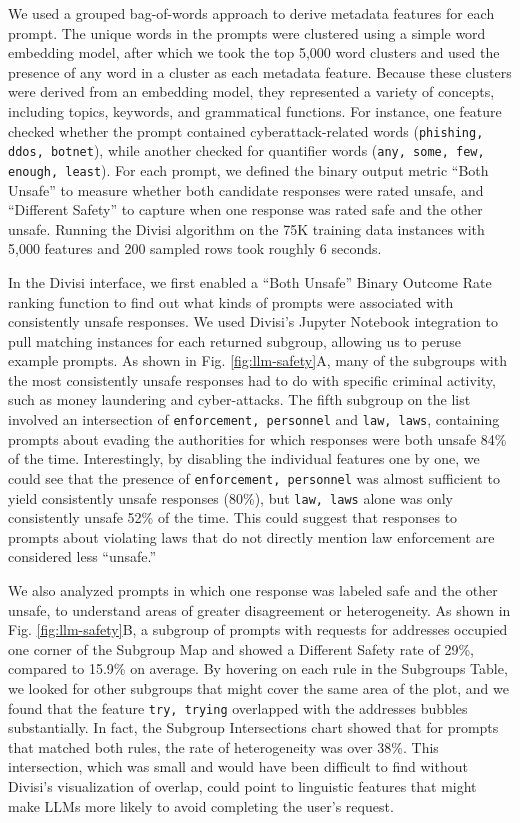 We used a grouped bag-of-words approach to derive metadata features for each prompt.
The unique words in the prompts were clustered using a simple word embedding model, after which we took the top 5,000 word clusters and used the presence of any word in a cluster as each metadata feature.
Because these clusters were derived from an embedding model, they represented a variety of concepts, including topics, keywords, and grammatical functions.
For instance, one feature checked whether the prompt contained cyberattack-related words (\texttt{phishing, ddos, botnet}), while another checked for quantifier words (\texttt{any, some, few, enough, least}).
For each prompt, we defined the binary output metric ``Both Unsafe'' to measure whether both candidate responses were rated unsafe, and ``Different Safety'' to capture when one response was rated safe and the other unsafe.
Running the Divisi algorithm on the 75K training data instances with 5,000 features and 200 sampled rows took roughly 6 seconds.

In the Divisi interface, we first enabled a ``Both Unsafe'' Binary Outcome Rate ranking function to find out what kinds of prompts were associated with consistently unsafe responses.
We used Divisi's Jupyter Notebook integration to pull matching instances for each returned subgroup, allowing us to peruse example prompts.
As shown in Fig. \ref{fig:llm-safety}A, many of the subgroups with the most consistently unsafe responses had to do with specific criminal activity, such as money laundering and cyber-attacks.
The fifth subgroup on the list involved an intersection of \texttt{enforcement, personnel} and \texttt{law, laws}, containing prompts about evading the authorities for which responses were both unsafe 84\% of the time.
Interestingly, by disabling the individual features one by one, we could see that the presence of \texttt{enforcement, personnel} was almost sufficient to yield consistently unsafe responses (80\%), but \texttt{law, laws} alone was only consistently unsafe 52\% of the time.
This could suggest that responses to prompts about violating laws that do not directly mention law enforcement are considered less ``unsafe.''

We also analyzed prompts in which one response was labeled safe and the other unsafe, to understand areas of greater disagreement or heterogeneity.
As shown in Fig. \ref{fig:llm-safety}B, a subgroup of prompts with requests for addresses occupied one corner of the Subgroup Map and showed a Different Safety rate of 29\%, compared to 15.9\% on average.
By hovering on each rule in the Subgroups Table, we looked for other subgroups that might cover the same area of the plot, and we found that the feature \texttt{try, trying} overlapped with the addresses bubbles substantially.
In fact, the Subgroup Intersections chart showed that for prompts that matched both rules, the rate of heterogeneity was over 38\%.
This intersection, which was small and would have been difficult to find without Divisi's visualization of overlap, could point to linguistic features that might make LLMs more likely to avoid completing the user's request.

